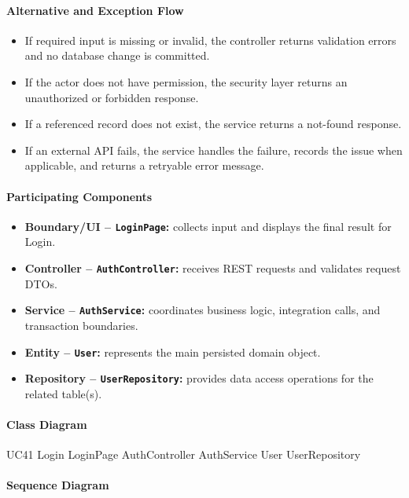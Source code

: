 \paragraph{Alternative and Exception Flow}

\begin{itemize}
    \item If required input is missing or invalid, the controller returns validation errors and no database change is committed.
    \item If the actor does not have permission, the security layer returns an unauthorized or forbidden response.
    \item If a referenced record does not exist, the service returns a not-found response.
    \item If an external API fails, the service handles the failure, records the issue when applicable, and returns a retryable error message.
\end{itemize}

\paragraph{Participating Components}

\begin{itemize}
    \item \textbf{Boundary/UI -- \texttt{LoginPage}:} collects input and displays the final result for Login.
    \item \textbf{Controller -- \texttt{AuthController}:} receives REST requests and validates request DTOs.
    \item \textbf{Service -- \texttt{AuthService}:} coordinates business logic, integration calls, and transaction boundaries.
    \item \textbf{Entity -- \texttt{User}:} represents the main persisted domain object.
    \item \textbf{Repository -- \texttt{UserRepository}:} provides data access operations for the related table(s).
\end{itemize}

\paragraph{Class Diagram}

\ClassDiagram
{UC41 Login}
{LoginPage}
{AuthController}
{AuthService}
{User}
{UserRepository}

\paragraph{Sequence Diagram}

